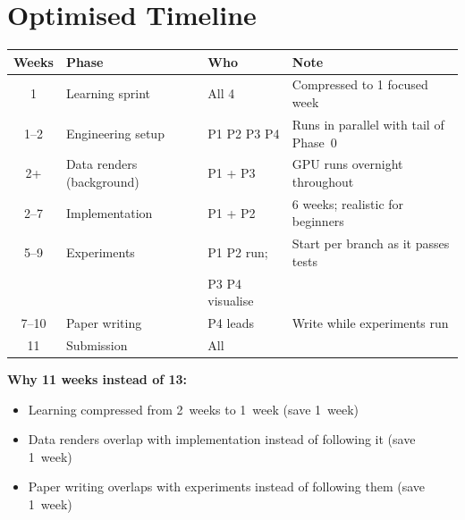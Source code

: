\documentclass[11pt,a4paper]{article}
\begin{document}
\section{Optimised Timeline}

\begin{center}
\renewcommand{\arraystretch}{1.3}
\begin{tabular}{@{}clll@{}}
  \toprule
  \textbf{Weeks} & \textbf{Phase} & \textbf{Who} & \textbf{Note} \\
  \midrule
  1     & Learning sprint           & All 4             & Compressed to 1 focused week \\
  1--2  & Engineering setup         & P1 P2 P3 P4       & Runs in parallel with tail of Phase~0 \\
  2+    & Data renders (background) & P1 + P3           & GPU runs overnight throughout \\
  2--7  & Implementation            & P1 + P2           & 6 weeks; realistic for beginners \\
  5--9  & Experiments               & P1 P2 run;        & Start per branch as it passes tests \\
        &                           & P3 P4 visualise   & \\
  7--10 & Paper writing             & P4 leads          & Write while experiments run \\
  11    & Submission                & All               & \\
  \bottomrule
\end{tabular}
\end{center}

\vspace{6pt}
\noindent\textbf{Why 11 weeks instead of 13:}
\begin{itemize}[leftmargin=1.8em, itemsep=2pt]
  \item Learning compressed from 2~weeks to 1~week (save 1~week)
  \item Data renders overlap with implementation instead of following it (save 1~week)
  \item Paper writing overlaps with experiments instead of following them (save 1~week)
\end{itemize}
\end{document}
